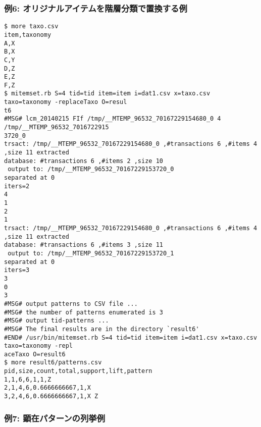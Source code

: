 \subsubsection*{例6: オリジナルアイテムを階層分類で置換する例}



\begin{Verbatim}[baselinestretch=0.7,frame=single]
$ more taxo.csv
item,taxonomy
A,X
B,X
C,Y
D,Z
E,Z
F,Z
$ mitemset.rb S=4 tid=tid item=item i=dat1.csv x=taxo.csv taxo=taxonomy -replaceTaxo O=resul
t6
#MSG# lcm_20140215 FIf /tmp/__MTEMP_96532_70167229154680_0 4 /tmp/__MTEMP_96532_7016722915
3720_0
trsact: /tmp/__MTEMP_96532_70167229154680_0 ,#transactions 6 ,#items 4 ,size 11 extracted 
database: #transactions 6 ,#items 2 ,size 10
 output to: /tmp/__MTEMP_96532_70167229153720_0
separated at 0
iters=2
4
1
2
1
trsact: /tmp/__MTEMP_96532_70167229154680_0 ,#transactions 6 ,#items 4 ,size 11 extracted 
database: #transactions 6 ,#items 3 ,size 11
 output to: /tmp/__MTEMP_96532_70167229153720_1
separated at 0
iters=3
3
0
3
#MSG# output patterns to CSV file ...
#MSG# the number of patterns enumerated is 3
#MSG# output tid-patterns ...
#MSG# The final results are in the directory `result6'
#END# /usr/bin/mitemset.rb S=4 tid=tid item=item i=dat1.csv x=taxo.csv taxo=taxonomy -repl
aceTaxo O=result6
$ more result6/patterns.csv
pid,size,count,total,support,lift,pattern
1,1,6,6,1,1,Z
2,1,4,6,0.6666666667,1,X
3,2,4,6,0.6666666667,1,X Z
\end{Verbatim}
\subsubsection*{例7: 顕在パターンの列挙例}



